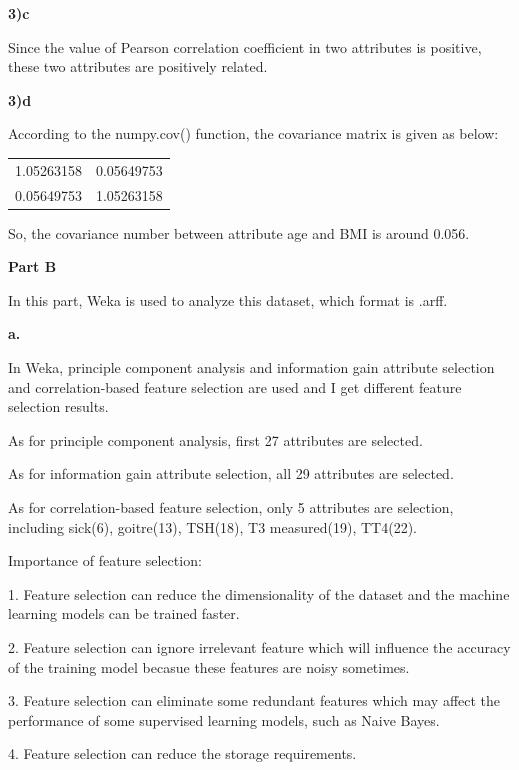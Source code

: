 \documentclass{article}
\begin{document}
\textbf{3)c}

Since the value of Pearson correlation coefficient in two attributes is positive, these two attributes are positively related.

\bigskip

\textbf{3)d}

According to the numpy.cov() function, the covariance matrix is given as below:

\begin{center}
\begin{tabular}{c c}
1.05263158 & 0.05649753 \\
0.05649753 & 1.05263158
\end{tabular}
\end{center}

So, the covariance number between attribute age and BMI is around 0.056.

\bigskip

\bigskip

\textbf{Part B}

In this part, Weka is used to analyze this dataset, which format is .arff.
\bigskip

\textbf{a.}

In Weka, principle component analysis and information gain attribute selection and correlation-based feature selection are used and I get different feature selection results.

As for principle component analysis, first 27 attributes are selected.

As for information gain attribute selection, all 29 attributes are selected.

As for correlation-based feature selection, only 5 attributes are selection, including sick(6), goitre(13), TSH(18), T3 measured(19), TT4(22).

\bigskip

Importance of feature selection:

1. Feature selection can reduce the dimensionality of the dataset and the machine learning models can be trained faster.

2. Feature selection can ignore irrelevant feature which will influence the accuracy of the training model becasue these features are noisy sometimes.

3. Feature selection can eliminate some redundant features which may affect the performance of some supervised learning models, such as Naive Bayes.

4. Feature selection can reduce the storage requirements.
\end{document}
